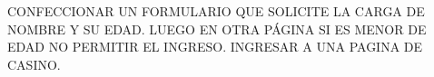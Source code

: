 CONFECCIONAR UN FORMULARIO QUE SOLICITE LA CARGA DE NOMBRE Y SU EDAD.
LUEGO EN OTRA PÁGINA SI ES MENOR DE EDAD NO PERMITIR EL INGRESO.
INGRESAR A UNA PAGINA DE CASINO.